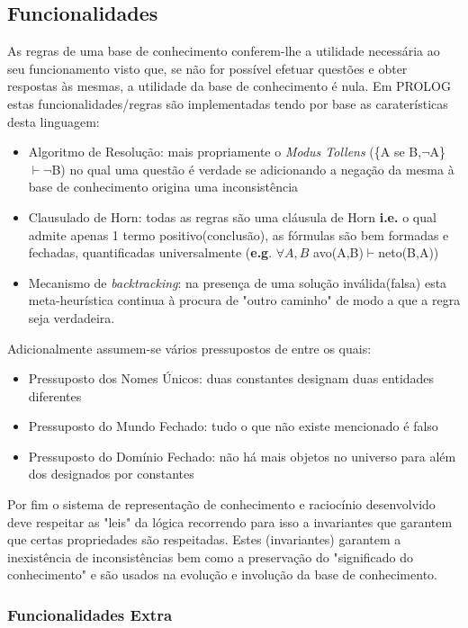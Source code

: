 \documentclass{article}
\begin{document}
\subsection{Funcionalidades}
As regras de uma base de conhecimento conferem-lhe a utilidade necessária ao seu funcionamento visto que, se não for possível efetuar questões e obter respostas às mesmas, a utilidade da base de conhecimento é nula. Em PROLOG estas funcionalidades/regras são implementadas tendo por base as caraterísticas desta linguagem:
\begin{itemize} 
	\item Algoritmo de Resolução: mais propriamente o \textit{Modus Tollens} (\{A se B,$\neg$A\}$\vdash\neg$B) no qual uma questão é verdade se adicionando a negação da mesma à base de conhecimento origina uma inconsistência
    \item Clausulado de Horn: todas as regras são uma cláusula de Horn \textbf{i.e.} o qual admite apenas 1 termo positivo(conclusão), as fórmulas são bem formadas e fechadas, quantificadas universalmente (\textbf{e.g}. $\forall{A,B}$ avo(A,B)$\vdash$neto(B,A))
    \item Mecanismo de \textit{backtracking}: na presença de uma solução inválida(falsa) esta meta-heurística continua à procura de "outro caminho" de modo a que a regra seja verdadeira.
\end{itemize}
Adicionalmente assumem-se vários pressupostos de entre os quais:
\begin{itemize}
	\item Pressuposto dos Nomes Únicos: duas constantes designam duas entidades diferentes
    \item Pressuposto do Mundo Fechado: tudo o que não existe mencionado é falso
    \item Pressuposto do Domínio Fechado: não há mais objetos no universo para além dos designados por constantes
\end{itemize}
Por fim o sistema de representação de conhecimento e raciocínio desenvolvido deve respeitar as "leis" da lógica recorrendo para isso a invariantes que garantem que certas propriedades são respeitadas. Estes (invariantes) garantem a inexistência de inconsistências bem como a preservação do "significado do conhecimento" e são usados na evolução e involução da base de conhecimento.

\subsubsection{Funcionalidades Extra}
\end{document}
